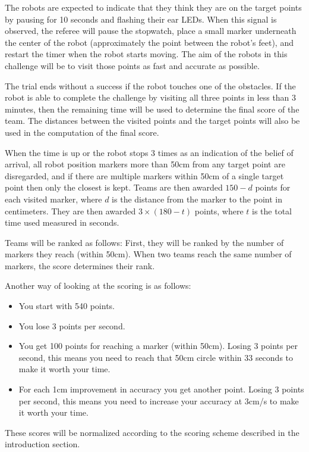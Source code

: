\documentclass{article}
\begin{document}
The robots are expected to indicate that they think they are on the target points by pausing for 10 seconds and flashing their ear LEDs. When this signal is observed, the referee will pause the stopwatch, place a small marker underneath the center of the robot (approximately the point between the robot's feet), and restart the timer when the robot starts moving. The aim of the robots in this challenge will be to visit those points as fast and accurate as possible.

The trial ends without a success if the robot touches one of the obstacles. If the robot is able to complete the challenge by visiting all three points in less than 3 minutes, then the remaining time will be used to determine the final score of the team. The distances between the visited points and the target points will also be used in the computation of the final score.

When the time is up or the robot stops 3 times as an indication of the belief of arrival, all robot position markers more than 50cm from any target point are disregarded, and if there are multiple markers within 50cm of a single target point then only the closest is kept. Teams are then awarded $150 - d$ points for each visited marker, where $d$ is the distance from the marker to the point in centimeters. They are then awarded $3 \times (180 - t)$ points, where $t$ is the total time used measured in seconds.

Teams will be ranked as follows: First, they will be ranked by the number of markers they reach (within 50cm). When two teams reach the same number of markers, the score determines their rank.

Another way of looking at the scoring is as follows:

\begin{itemize}
 \item You start with 540 points.
 \item You lose 3 points per second.
 \item You get 100 points for reaching a marker (within 50cm). Losing 3 points per second, this means you need to reach that 50cm circle within 33 seconds to make it worth your time.
 \item For each 1cm improvement in accuracy you get another point. Losing 3 points per second, this means you need to increase your accuracy at 3cm/s to make it worth your time. 
\end{itemize}

These scores will be normalized according to the scoring scheme described in the introduction section.
\end{document}
